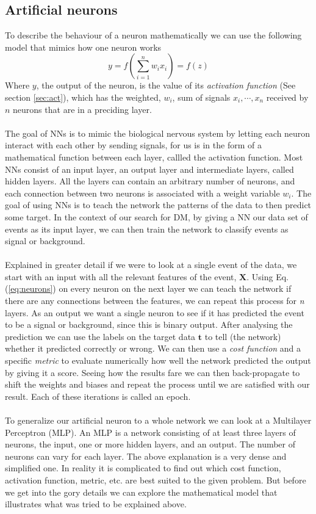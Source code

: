 \documentclass[12pt, a4paper]{book}
\begin{document}
\subsection{Artificial neurons}\label{sec:neurons}
To describe the behaviour of a neuron mathematically we can use the following model that mimics how one neuron works
\begin{equation}\label{eq:neurons}
    y=f\left(\sum_{i=1}^{n}w_ix_i\right)=f(z)
\end{equation}
Where $y$, the output of the neuron, is the value of its \textit{activation function} (See section \ref{sec:act}), which has the weighted, $w_i$, sum of signals $x_i,\cdots,x_n$ received by $n$ neurons that are in a preciding layer.\\
\\The goal of NNs is to mimic the biological nervous system by letting each neuron interact with each other by sending signals, for us is in the form of a mathematical function between each layer, callled the activation function. 
Most NNs consist of an input layer, an output layer and intermediate layers, called hidden layers. All the layers can contain an arbitrary number of neurons, and each connection between two neurons is associated with a weight variable $w_i$.
The goal of using NNs is to teach the network the patterns of the data to then predict some target. In the context of our search for DM, by giving a NN our data set of events as its input layer, we can then train the network to classify events as signal or background.\\
\\Explained in greater detail if we were to look at a single event of the data, we start with an input with all the relevant features of the event, $\bm X$. Using Eq. (\ref{eq:neurons}) on every neuron on the next layer we can teach the network if there 
are any connections between the features, we can repeat this process for \textit{n} layers. As an output we want a single neuron to see if it has predicted the event to be a signal or background, since this is binary output. After analysing the prediction we can use the labels on the target data $\bm t$ 
to tell (the network) whether it predicted correctly or wrong. We can then use a \textit{cost function} and a specific \textit{metric} to evaluate numerically how well the network predicted the output by giving it a score. 
Seeing how the results fare we can then back-propagate to shift the weights and biases and repeat the process until we are satisfied with our result. Each of these iterations is called an epoch.\\
\\To generalize our artificial neuron to a whole network we can look at a Multilayer Perceptron (MLP). An MLP is a network consisting of at least three layers of neurons, the input, one or more hidden layers, and an output. 
The number of neurons can vary for each layer. The above explanation is a very dense and simplified one. In reality it is complicated to find out which cost function, activation function, metric, etc. are best suited to the given problem. 
But before we get into the gory details we can explore the mathematical model that illustrates what was tried to be explained above. 
\end{document}
